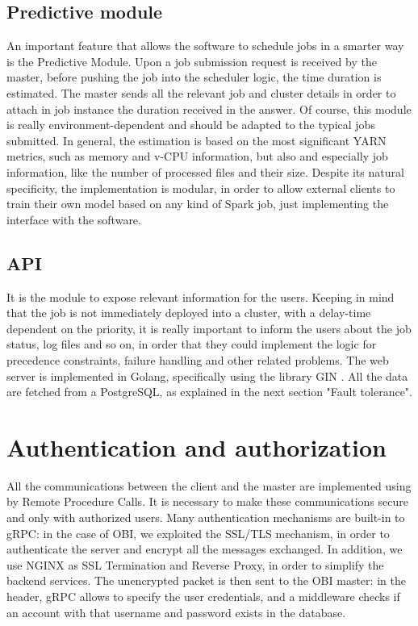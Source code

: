 \documentclass[12pt,twoside,cucitura]{toptesi}
\begin{document}
\subsection{Predictive module}
An important feature that allows the software to schedule jobs in a smarter way is the Predictive Module. Upon a job submission request is received by the master, before pushing the job into the scheduler logic, the time duration is estimated. The master sends all the relevant job and cluster details in order to attach in job instance the duration received in the answer.
Of course, this module is really environment-dependent and should be adapted to the typical jobs submitted. In general, the estimation is based on the most significant YARN metrics, such as memory and v-CPU information, but also and especially job information, like the number of processed files and their size. Despite its natural specificity, the implementation is modular, in order to allow external clients to train their own model based on any kind of Spark job, just implementing the interface with the software.

\subsection{API}
It is the module to expose relevant information for the users. Keeping in mind that the job is not immediately deployed into a cluster, with a delay-time dependent on the priority, it is really important to inform the users about the job status, log files and so on, in order that they could implement the logic for precedence constraints, failure handling and other related problems. The web server is implemented in Golang, specifically using the library GIN \cite{gin}. All the data are fetched from a PostgreSQL, as explained in the next section "Fault tolerance".

\section{Authentication and authorization}
All the communications between the client and the master are implemented using by Remote Procedure Calls. It is necessary to make these communications secure and only with authorized users. Many authentication mechanisms are built-in to gRPC: in the case of OBI, we exploited the SSL/TLS mechanism, in order to authenticate the server and encrypt all the messages exchanged. In addition, we use NGINX as SSL Termination and Reverse Proxy, in order to simplify the backend services. The unencrypted packet is then sent to the OBI master: in the header, gRPC allows to specify the user credentials, and a middleware checks if an account with that username and password exists in the database. 
\end{document}
